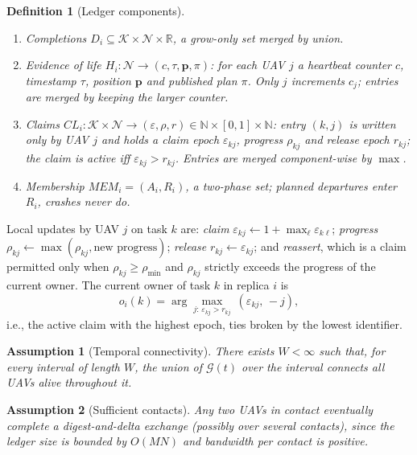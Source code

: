 \documentclass[journal]{IEEEtran}
\newtheorem{assumption}{Assumption}
\newtheorem{definition}{Definition}
\newcommand{\rhomin}{\rho_{\min}}
\begin{document}
\begin{definition}[Ledger components]
\begin{enumerate}
\item \emph{Completions} $D_i\subseteq\mathcal{K}\times\mathcal{N}\times\mathbb{R}$, a grow-only set merged by union.
\item \emph{Evidence of life} $H_i:\mathcal{N}\to(c,\tau,\mathbf{p},\pi)$: for each UAV $j$ a heartbeat counter $c$, timestamp $\tau$, position $\mathbf{p}$ and published plan $\pi$. Only $j$ increments $c_j$; entries are merged by keeping the larger counter.
\item \emph{Claims} $\mathit{CL}_i:\mathcal{K}\times\mathcal{N}\to(\varepsilon,\rho,r)\in\mathbb{N}\times[0,1]\times\mathbb{N}$: entry $(k,j)$ is written only by UAV $j$ and holds a claim epoch $\varepsilon_{kj}$, progress $\rho_{kj}$ and release epoch $r_{kj}$; the claim is \emph{active} iff $\varepsilon_{kj}>r_{kj}$. Entries are merged component-wise by $\max$.
\item \emph{Membership} $\mathit{MEM}_i=(A_i,R_i)$, a two-phase set; planned departures enter $R_i$, crashes never do.
\end{enumerate}
\end{definition}

Local updates by UAV $j$ on task $k$ are: \emph{claim} $\varepsilon_{kj}\leftarrow 1+\max_\ell\varepsilon_{k\ell}$; \emph{progress} $\rho_{kj}\leftarrow\max(\rho_{kj},\text{new progress})$; \emph{release} $r_{kj}\leftarrow\varepsilon_{kj}$; and \emph{reassert}, which is a claim permitted only when $\rho_{kj}\ge\rhomin$ and $\rho_{kj}$ strictly exceeds the progress of the current owner. The current owner of task $k$ in replica $i$ is
\begin{equation}
o_i(k)=\arg\max_{j:\,\varepsilon_{kj}>r_{kj}}\ (\varepsilon_{kj},\,-j),\label{eq:owner}
\end{equation}
i.e., the active claim with the highest epoch, ties broken by the lowest identifier.

\begin{assumption}[Temporal connectivity]\label{as:tc}
There exists $W<\infty$ such that, for every interval of length $W$, the union of $\mathcal{G}(t)$ over the interval connects all UAVs alive throughout it.
\end{assumption}

\begin{assumption}[Sufficient contacts]\label{as:contact}
Any two UAVs in contact eventually complete a digest-and-delta exchange (possibly over several contacts), since the ledger size is bounded by $O(M N)$ and bandwidth per contact is positive.
\end{assumption}
\end{document}
